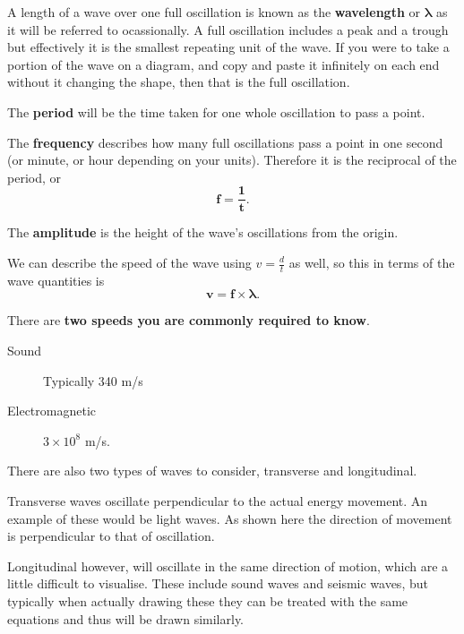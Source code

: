 \documentclass[11pt, titlepage]{article}
\begin{document}
A length of a wave over one full oscillation is known as the \textbf{wavelength} or $\mathbf{\lambda}$ as it will be referred to ocassionally.  A full oscillation includes a peak and a trough but effectively it is the smallest repeating unit of the wave.  If you were to take a portion of the wave on a diagram, and copy and paste it infinitely on each end without it changing the shape, then that is the full oscillation.

The \textbf{period} will be the time taken for one whole oscillation to pass a point.

The \textbf{frequency} describes how many full oscillations pass a point in one second (or minute, or hour depending on your units).  Therefore it is the reciprocal of the period, or
\begin{equation*}
\mathbf{f = \frac{1}{t}}.
\end{equation*}

The \textbf{amplitude} is the height of the wave's oscillations from the origin.

\begin{figure}[H]
\centering

\end{figure}

We can describe the speed of the wave using $v=\frac{d}{t}$ as well, so this in terms of the wave quantities is
\begin{equation}
\mathbf{v = f \times \lambda}.
\end{equation}

There are \textbf{two speeds you are commonly required to know}.

\begin{description}
\item[Sound] Typically 340 m/s
\item[Electromagnetic] $3\times10^8$ m/s.
\end{description}

There are also two types of waves to consider, transverse and longitudinal.  

Transverse waves oscillate perpendicular to the actual energy movement.  An example of these would be light waves.  As shown here the direction of movement is perpendicular to that of oscillation.
\begin{figure}[H]
\centering

\end{figure}

Longitudinal however, will oscillate in the same direction of motion, which are a little difficult to visualise.  These include sound waves and seismic waves, but typically when actually drawing these they can be treated with the same equations and thus will be drawn similarly.
\end{document}
